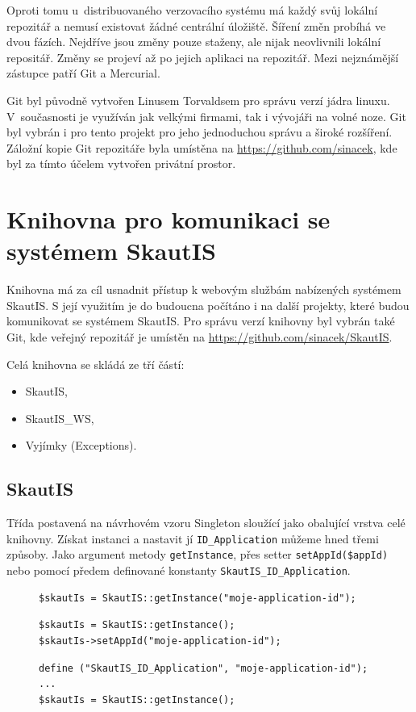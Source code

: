 \documentclass[thesis=B,czech]{FITthesis}[2011/06/14]
\begin{document}
Oproti tomu u~distribuovaného verzovacího systému má každý svůj lokální repozitář a nemusí existovat žádné centrální úložiště. Šíření změn probíhá ve dvou fázích. Nejdříve jsou změny pouze staženy, ale nijak neovlivnili lokální repositář. Změny se projeví až po jejich aplikaci na repozitář. Mezi nejznámější zástupce patří Git a Mercurial.

Git byl původně vytvořen Linusem Torvaldsem pro správu verzí jádra linuxu. V~současnosti je využíván jak velkými firmami, tak i vývojáři na volné noze. Git byl vybrán i pro tento projekt pro jeho jednoduchou správu a široké rozšíření. Záložní kopie Git repozitáře byla umístěna na \url{https://github.com/sinacek}, kde byl za tímto účelem vytvořen privátní prostor.

\section{Knihovna pro komunikaci se systémem SkautIS}
Knihovna má za cíl usnadnit přístup k webovým službám nabízených systémem SkautIS. S její využitím je do budoucna počítáno i na další projekty, které budou komunikovat se systémem SkautIS. Pro správu verzí knihovny byl vybrán také Git, kde veřejný repozitář je umístěn na \url{https://github.com/sinacek/SkautIS}.

Celá knihovna se skládá ze tří částí:
\begin{itemize}
	\item SkautIS,
	\item SkautIS\_WS,
	\item Vyjímky (Exceptions).
\end{itemize}

\subsection{SkautIS}
Třída postavená na návrhovém vzoru Singleton sloužící jako obalující vrstva celé knihovny. Získat instanci a nastavit jí \texttt{ID\_Application} můžeme hned třemi způsoby. Jako argument metody \texttt{getInstance}, přes setter \texttt{setAppId(\$appId)} nebo pomocí předem definované konstanty \texttt{SkautIS\_ID\_Application}.

\begin{figure}
\begin{lstlisting}[caption=Nastavení parametrů knihovny SkautIS -- přes argument]
$skautIs = SkautIS::getInstance("moje-application-id");
\end{lstlisting}

\begin{lstlisting}[caption=Nastavení parametrů knihovny SkautIS -- přes setter]
$skautIs = SkautIS::getInstance();
$skautIs->setAppId("moje-application-id"); 
\end{lstlisting}

\begin{lstlisting}[caption=Nastavení parametrů knihovny SkautIS -- přes konstantu]
define ("SkautIS_ID_Application", "moje-application-id"); 
...
$skautIs = SkautIS::getInstance(); 
\end{lstlisting}
\end{figure}
\end{document}
